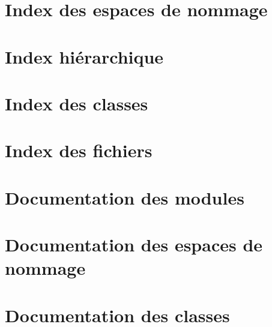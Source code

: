 \documentclass[twoside]{book}
\newcommand{\+}{\discretionary{\mbox{\scriptsize$\hookleftarrow$}}{}{}}
\begin{document}
\chapter{Index des espaces de nommage}

\chapter{Index hiérarchique}

\chapter{Index des classes}

\chapter{Index des fichiers}

\chapter{Documentation des modules}

\chapter{Documentation des espaces de nommage}

\chapter{Documentation des classes}







































\end{document}
